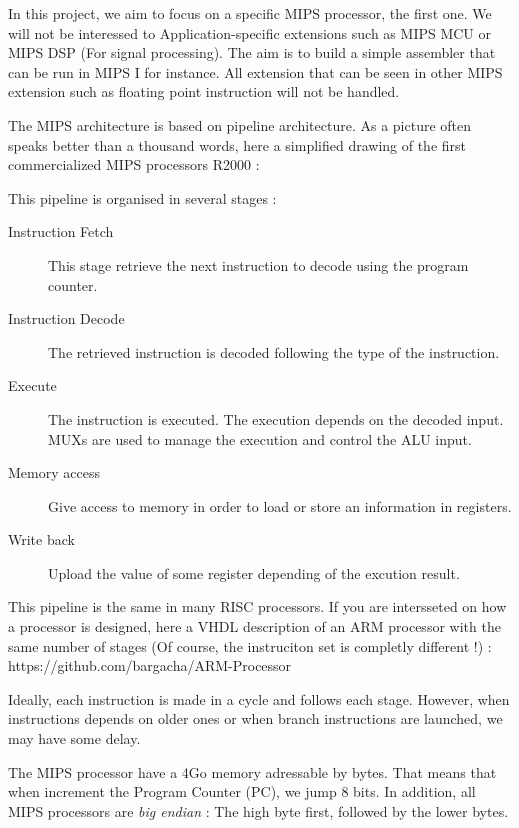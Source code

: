 \documentclass[twoside,twocolumn]{article}
\begin{document}
In this project, we aim to focus on a specific MIPS processor, the first one. We will not be interessed to Application-specific extensions such as MIPS MCU or MIPS DSP (For signal processing). The aim is to build a simple assembler that can be run in MIPS I for instance. All extension that can be seen in other MIPS extension such as floating point instruction will not be handled.

The MIPS architecture is based on pipeline architecture. As a picture often speaks better than a thousand words, here a simplified drawing of the first commercialized MIPS processors R2000 :



This pipeline is organised in several stages :

\begin{description}
 \item[ Instruction Fetch ] This stage retrieve the next instruction to decode using the program counter.
 \item[ Instruction Decode ] The retrieved instruction is decoded following the type of the instruction.
 \item[ Execute ] The instruction is executed. The execution depends on the decoded input. MUXs are used to manage the execution and control the ALU input.
 \item[ Memory access ] Give access to memory in order to load or store an information in registers.
 \item[ Write back ] Upload the value of some register depending of the excution result.
\end{description}

This pipeline is the same in many RISC processors. If you are intersseted on how a processor is designed, here a VHDL description of an ARM processor with the same number of stages (Of course, the instruciton set is completly different !) : https://github.com/bargacha/ARM-Processor

Ideally, each instruction is made in a cycle and follows each stage. However, when instructions depends on older ones or when branch instructions are launched, we may have some delay.

The MIPS processor have a 4Go memory adressable by bytes. That means that when increment the Program Counter (PC), we jump 8 bits. In addition, all MIPS processors are \textit{big endian} : The high byte first, followed by the lower bytes.
\end{document}
